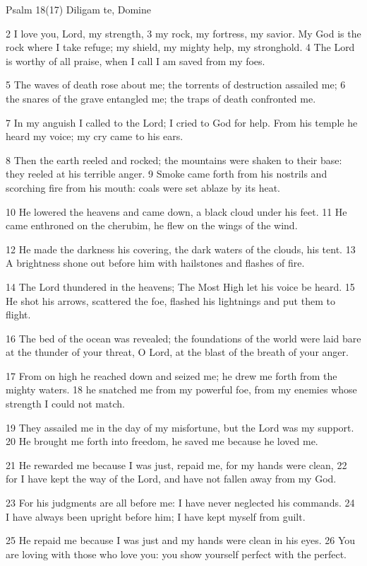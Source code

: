 Psalm 18(17) Diligam te, Domine

2 I love you, Lord, my strength,
3 my rock, my fortress, my savior.
My God is the rock where I take refuge;
my shield, my mighty help, my stronghold.
4 The Lord is worthy of all praise,
when I call I am saved from my foes.

5 The waves of death rose about me;
the torrents of destruction assailed me;
6 the snares of the grave entangled me;
the traps of death confronted me.

7 In my anguish I called to the Lord;
I cried to God for help.
From his temple he heard my voice;
my cry came to his ears.

8 Then the earth reeled and rocked;
the mountains were shaken to their base:
they reeled at his terrible anger.
9 Smoke came forth from his nostrils
and scorching fire from his mouth:
coals were set ablaze by its heat.

10 He lowered the heavens and came down,
a black cloud under his feet.
11 He came enthroned on the cherubim,
he flew on the wings of the wind.

12 He made the darkness his covering,
the dark waters of the clouds, his tent.
13 A brightness shone out before him
with hailstones and flashes of fire.

14 The Lord thundered in the heavens;
The Most High let his voice be heard.
15 He shot his arrows, scattered the foe,
flashed his lightnings and put them to flight.

16 The bed of the ocean was revealed;
the foundations of the world were laid bare
at the thunder of your threat, O Lord,
at the blast of the breath of your anger.

17 From on high he reached down and seized me;
he drew me forth from the mighty waters.
18 he snatched me from my powerful foe,
from my enemies whose strength I could not match.

19 They assailed me in the day of my misfortune,
but the Lord was my support.
20 He brought me forth into freedom,
he saved me because he loved me.

21 He rewarded me because I was just,
repaid me, for my hands were clean,
22 for I have kept the way of the Lord,
and have not fallen away from my God.

23 For his judgments are all before me:
I have never neglected his commands.
24 I have always been upright before him;
I have kept myself from guilt.

25 He repaid me because I was just
and my hands were clean in his eyes.
26 You are loving with those who love you:
you show yourself perfect with the perfect.

